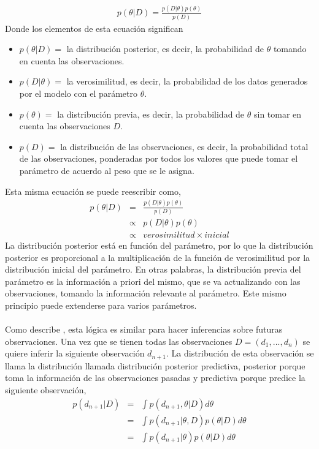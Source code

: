 \begin{align*}
p(\theta|D)=\frac{p(D|\theta)p(\theta)}{p(D)}
\end{align*}
Donde los elementos de esta ecuaci\'on significan
\begin{itemize}
\item $p(\theta|D)=$ la distribuci\'on posterior, es decir, la probabilidad de $\theta$ tomando en cuenta las observaciones.
\item $p(D|\theta)=$ la verosimilitud, es decir, la probabilidad de los datos generados por el modelo con el par\'ametro $\theta$.
\item $p(\theta)=$ la distribuci\'on previa, es decir, la probabilidad de $\theta$ sin tomar en cuenta las observaciones $D$.
\item $p(D)=$ la distribuci\'on de las observaciones, es decir, la probabilidad total de las observaciones, ponderadas por todos los valores que puede tomar el par\'ametro de acuerdo al peso que se le asigna.
\end{itemize}
Esta misma ecuaci\'on se puede reescribir como,
\begin{eqnarray*}
p(\theta|D)&=&\frac{p(D|\theta)p(\theta)}{p(D)}\\
		   &\propto & p(D|\theta)p(\theta)\\
		   &\propto & verosimilitud \times inicial
\end{eqnarray*}
La distribuci\'on posterior est\'a en funci\'on del par\'ametro, por lo que la distribuci\'on posterior es proporcional a la multiplicaci\'on de la funci\'on de verosimilitud por la distribuci\'on inicial del par\'ametro. En otras palabras, la distribuci\'on previa del par\'ametro es la informaci\'on a priori del mismo, que se va actualizando con las observaciones, tomando la informaci\'on relevante al par\'ametro. Este mismo principio puede extenderse para varios par\'ametros.\\
\\
Como describe \cite{gelman2014bayesian}, esta l\'ogica es similar para hacer inferencias sobre futuras observaciones. Una vez que se tienen todas las observaciones $D=(d_1,...,d_n)$ se quiere inferir la siguiente observaci\'on $d_{n+1}$. La distribuci\'on de esta observaci\'on se llama la distribuci\'on llamada distribuci\'on posterior predictiva, posterior porque toma la informaci\'on de las observaciones pasadas y predictiva porque predice la siguiente observaci\'on,
\begin{eqnarray*}
p(d_{n+1}|D)&=&\int p(d_{n+1},\theta|D) d\theta \\
			&=& \int p(d_{n+1}|\theta,D)p(\theta|D)d\theta \\
			&=& \int p(d_{n+1}|\theta)p(\theta|D)d\theta
\end{eqnarray*}
